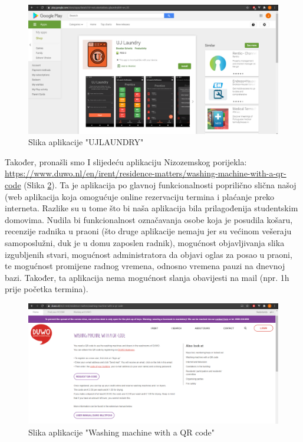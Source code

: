 			\begin{figure}[H]
				\includegraphics[width=.9\linewidth]{slike/UJLAUNDRY.PNG}
				\centering
				\caption{Slika aplikacije "UJLAUNDRY"}
				\label{fig:ujlaundry}
			\end{figure}
		
			{Također, pronašli smo I slijedeću aplikaciju Nizozemskog porijekla: \url{https://www.duwo.nl/en/irent/residence-matters/washing-machine-with-a-qr-code} (Slika  \ref{fig:duwo}). Ta je aplikacija po glavnoj funkcionalnosti 
			poprilično slična našoj (web aplikacija koja omogućuje online rezervaciju termina i plaćanje preko
			interneta. Razlike su u tome što bi naša aplikacija bila prilagođenija studentskim domovima. Nudila bi
			funkcionalnost označavanja osobe koja je posudila košaru, recenzije radnika u praoni (što druge
			aplikacije nemaju jer su većinom vešeraju samoposlužni, duk je u domu zaposlen radnik), mogućnost
			objavljivanja slika izgubljenih stvari, mogućnost administratora da objavi oglas za posao u praoni, te
			mogućnost promijene radnog vremena, odnosno vremena pauzi na dnevnoj bazi. Također, ta aplikacija
			nema mogućnost slanja obavijesti na mail (npr. 1h prije početka termina).}
		
			\begin{figure}[H]
				\includegraphics[width=.9\linewidth]{slike/DUWO.PNG}
				\centering
				\caption{Slika aplikacije "Washing machine with a QR code"}
				\label{fig:duwo}
			\end{figure}
		
